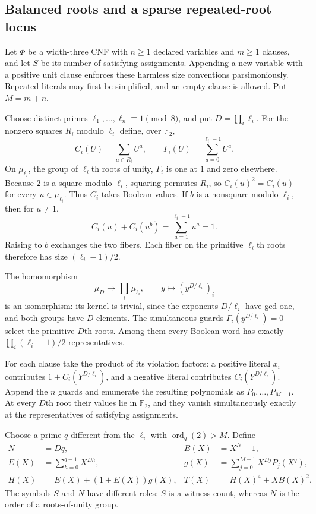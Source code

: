 \subsection{Balanced roots and a sparse repeated-root locus}
Let $\Phi$ be a width-three CNF with $n\geq1$ declared variables and $m\geq1$ clauses, and let $S$ be its number of satisfying assignments. Appending a new variable with a positive unit clause enforces these harmless size conventions parsimoniously. Repeated literals may first be simplified, and an empty clause is allowed. Put $M=m+n$.

Choose distinct primes $\ell_1,\ldots,\ell_n\equiv1\pmod8$, and put $D=\prod_i\ell_i$. For the nonzero squares $R_i$ modulo $\ell_i$ define, over $\mathbb F_2$,
\[
 C_i(U)=\sum_{a\in R_i}U^a,
 \qquad \Gamma_i(U)=\sum_{a=0}^{\ell_i-1}U^a.
\]
On $\mu_{\ell_i}$, the group of $\ell_i$th roots of unity, $\Gamma_i$ is one at $1$ and zero elsewhere. Because $2$ is a square modulo $\ell_i$, squaring permutes $R_i$, so $C_i(u)^2=C_i(u)$ for every $u\in\mu_{\ell_i}$. Thus $C_i$ takes Boolean values. If $b$ is a nonsquare modulo $\ell_i$, then for $u\neq1$,
\[
 C_i(u)+C_i(u^b)=\sum_{a=1}^{\ell_i-1}u^a=1.
\]
Raising to $b$ exchanges the two fibers. Each fiber on the primitive $\ell_i$th roots therefore has size $(\ell_i-1)/2$.

The homomorphism
\[
 \mu_D\longrightarrow\prod_i\mu_{\ell_i},
 \qquad y\longmapsto (y^{D/\ell_i})_i
\]
is an isomorphism: its kernel is trivial, since the exponents $D/\ell_i$ have gcd one, and both groups have $D$ elements. The simultaneous guards $\Gamma_i(y^{D/\ell_i})=0$ select the primitive $D$th roots. Among them every Boolean word has exactly
$\prod_i(\ell_i-1)/2$ representatives.

For each clause take the product of its violation factors: a positive literal $x_i$ contributes $1+C_i(Y^{D/\ell_i})$, and a negative literal contributes $C_i(Y^{D/\ell_i})$. Append the $n$ guards and enumerate the resulting polynomials as $P_0,\ldots,P_{M-1}$. At every $D$th root their values lie in $\mathbb F_2$, and they vanish simultaneously exactly at the representatives of satisfying assignments.

Choose a prime $q$ different from the $\ell_i$ with $\operatorname{ord}_q(2)>M$. Define
\begin{align}
 N&=Dq,& B(X)&=X^N-1,\\
 E(X)&=\sum_{h=0}^{q-1}X^{Dh},&
 g(X)&=\sum_{j=0}^{M-1}X^{Dj}P_j(X^q),\\
 H(X)&=E(X)+(1+E(X))g(X),&
 T(X)&=H(X)^4+XB(X)^2.
\end{align}
The symbols $S$ and $N$ have different roles: $S$ is a witness count, whereas $N$ is the order of a roots-of-unity group.

